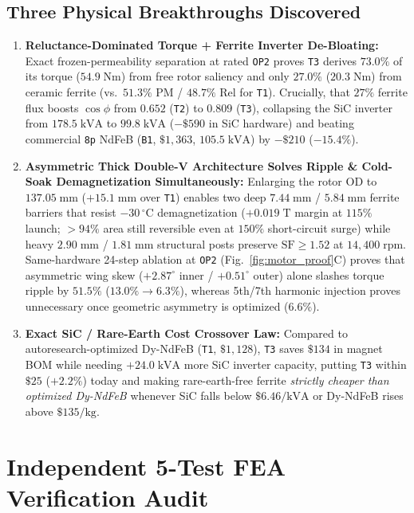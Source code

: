 \documentclass[twocolumn,10pt]{article}
\begin{document}
\subsection{Three Physical Breakthroughs Discovered}
\begin{enumerate}\setlength{\itemsep}{1pt}
  \item \textbf{Reluctance-Dominated Torque + Ferrite Inverter De-Bloating:} Exact frozen-permeability separation \citep{chu2013frozen} at rated \texttt{OP2} proves \texttt{T3} derives $73.0\%$ of its torque ($54.9\;\text{Nm}$) from free rotor saliency and only $27.0\%$ ($20.3\;\text{Nm}$) from ceramic ferrite (vs.\ $51.3\%$ PM / $48.7\%$ Rel for \texttt{T1}). Crucially, that $27\%$ ferrite flux boosts $\cos\phi$ from $0.652$ (\texttt{T2}) to $0.809$ (\texttt{T3}), collapsing the SiC inverter from $178.5\;\text{kVA}$ to $99.8\;\text{kVA}$ ($-\$590$ in SiC hardware) and beating commercial \texttt{8p} NdFeB (\texttt{B1}, $\$1{,}363$, $105.5\;\text{kVA}$) by $-\$210$ ($-15.4\%$).
  \item \textbf{Asymmetric Thick Double-V Architecture Solves Ripple \& Cold-Soak Demagnetization Simultaneously:} Enlarging the rotor OD to $137.05\;\text{mm}$ ($+15.1\;\text{mm}$ over \texttt{T1}) enables two deep $7.44\;\text{mm}$ / $5.84\;\text{mm}$ ferrite barriers that resist $-30\,^\circ\text{C}$ demagnetization ($+0.019\;\text{T}$ margin at $115\%$ launch; $>94\%$ area still reversible even at $150\%$ short-circuit surge) while heavy $2.90\;\text{mm}$ / $1.81\;\text{mm}$ structural posts preserve $\text{SF}\ge 1.52$ at $14{,}400\;\text{rpm}$. Same-hardware 24-step ablation at \texttt{OP2} (Fig.~\ref{fig:motor_proof}C) proves that asymmetric wing skew ($+2.87^\circ$ inner / $+0.51^\circ$ outer) alone slashes torque ripple by $51.5\%$ ($13.0\%\to 6.3\%$), whereas 5th/7th harmonic injection proves unnecessary once geometric asymmetry is optimized ($6.6\%$).
  \item \textbf{Exact SiC / Rare-Earth Cost Crossover Law:} Compared to autoresearch-optimized Dy-NdFeB (\texttt{T1}, $\$1{,}128$), \texttt{T3} saves $\$134$ in magnet BOM while needing $+24.0\;\text{kVA}$ more SiC inverter capacity, putting \texttt{T3} within $\$25$ ($+2.2\%$) today and making rare-earth-free ferrite \emph{strictly cheaper than optimized Dy-NdFeB} whenever SiC falls below $\$6.46/\text{kVA}$ or Dy-NdFeB rises above $\$135/\text{kg}$.
\end{enumerate}

\section{Independent 5-Test FEA Verification Audit}
\end{document}
